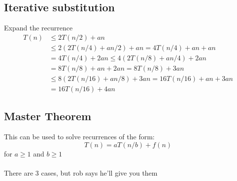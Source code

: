 \documentclass{article}[18pt]
\begin{document}
\subsection{Iterative substitution}
Expand the recurrence
\[
\begin{aligned} T(n) & \leq 2 T(n / 2)+a n \\ & \leq 2(2 T(n / 4)+a n / 2)+a n=4 T(n / 4)+a n+a n \\ &=4 T(n / 4)+2 a n \leq 4(2 T(n / 8)+a n / 4)+2 a n \\ &=8 T(n / 8)+a n+2 a n=8 T(n / 8)+3 a n \\ & \leq 8(2 T(n / 16)+a n / 8)+3 a n=16 T(n / 16)+a n+3 a n \\ &=16 T(n / 16)+4 a n \end{aligned}
\]
\subsection{Master Theorem}
This can be used to solve recurrences of the form:
\[
T(n)=a T(n / b)+f(n)
\]
for $a\geqslant 1$ and $b\geq 1$\\
\\
There are 3 cases, but rob says he'll give you them
\end{document}

